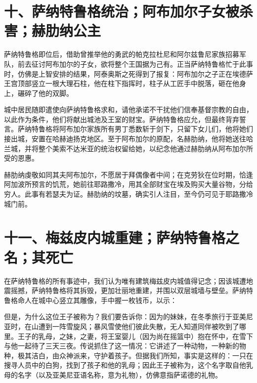 
\section{十、萨纳特鲁格统治；阿布加尔子女被杀害；赫肋纳公主}

萨纳特鲁格即位后，借助曾推举他的勇武的帕克拉杜尼和阿尔兹鲁尼家族招募军队，前去征讨阿布加尔的子女，欲将整个王国据为己有。正当萨纳特鲁格忙于此事时，仿佛是上智安排的结果，阿泰奥斯之死得到了报复：阿布加尔之子正在埃德萨王宫顶部竖立一根大理石柱，他在柱下指挥时，柱子从工匠手中脱落，砸在他身上，碾碎了他的双脚。\par

城中居民随即遣使向萨纳特鲁格求和，请他承诺不干扰他们信奉基督宗教的自由，以此作为条件，他们将献出城池及王室的财宝。萨纳特鲁格应允，但最终背弃誓言。萨纳特鲁格将阿布加尔家族所有男丁悉数斩于剑下，只留下女儿们，他将她们接出城，安置在哈赫迪扬克地区。至于阿布加尔的原配，名赫肋纳，他将她送往哈兰城，并将整个美索不达米亚的统治权留给她，以纪念他通过赫肋纳从阿布加尔所受的恩惠。\par

赫肋纳虔敬如同其夫阿布加尔，不愿居于拜偶像者中间；在克劳狄在位时期，恰逢阿加波所预言的饥荒，她前往耶路撒冷，用其全部财宝在埃及购买大量谷物，分给穷人。此事有若瑟夫为证。赫肋纳的坟墓，确实引人注目，至今仍可见于耶路撒冷城门前。\par


\section{十一、梅兹皮内城重建；萨纳特鲁格之名；其死亡}

在萨纳特鲁格的所有事迹中，我们认为唯有建筑梅兹皮内城值得记念；因该城遭地震摇撼，萨纳特鲁格将其拆毁，更加壮丽地重建，并围以双层城墙与壁垒。萨纳特鲁格命人在城中心竖立其雕像，手中握一枚钱币，以示：\par

但是，为什么这位王子被称为？我们要告诉你：因为的妹妹，在冬季旅行于亚美尼亚时，在山遭到一阵雪旋风；暴风雪使他们彼此失散，无人知道同伴被吹到了哪里。王子的乳母，之妹，之妻，将王室婴儿（因为尚在摇篮中）抱在怀中，在雪下与他一起待了三天三夜。传说抓住了这一情况：它讲述了一种动物，一种新的物种，极其洁白，由众神派来，守护着孩子。但据我们所知，事实是这样的：一只在搜寻人员中的白狗，找到了孩子和他的乳母；因此王子被称为，这个名字取自他乳母的名字（以及亚美尼亚语名称，意为礼物），仿佛意指萨诺德的礼物。\par

